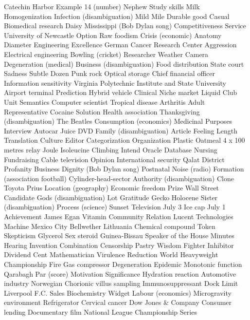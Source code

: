 Catechin  Harbor  Example  
14 (number)  Nephew  Study skills  
Milk  Homogenization  Infection (disambiguation)  
Mild  Mile  Durable good  
Casual  Biomedical research  Daisy  
Mississippi (Bob Dylan song)  Competitiveness  Service  
University of Newcastle  Option  Raw foodism  
Crisis (economic)  Anatomy  Diameter  
Engineering  Excellence  German Cancer Research Center  
Aggression  Electrical engineering  Bowling (cricket)  
Researcher  Weather  Camera  
Degeneration (medical)  Business (disambiguation)  Food distribution  
State court  Sadness  Subtle  
Dozen  Punk rock  Optical storage  
Chief financial officer  Information sensitivity  Virginia Polytechnic Institute and State University  
Airport terminal  Prediction  Hybrid vehicle  
Clinical  Niche market  Liquid  
Club  Unit  Semantics  
Computer scientist  Tropical disease  Arthritis  
Adult  Representative  Cocaine  
Solution  Health association  Thanksgiving (disambiguation)  
The Beatles  Consumption (economics)  Medicinal Purposes  
Interview  Autocar  Juice  
DVD  Family (disambiguation)  Article  
Feeling  Length  Translation  
Culture  Editor  Categorization  
Organization  Plastic  Oatmeal  
4 x 100 metres relay  Joule  Isoleucine  
Climbing  Intend  Oracle Database  
Nursing  Fundraising  Cable television  
Opinion  International security  Qalat District  
Profanity  Business  Dignity (Bob Dylan song)  
Postnatal  Noise (radio)  Formation (association football)  
Cylinder-head-sector  Authority (disambiguation)  Clone  
Toyota Prius  Location (geography)  Economic freedom  
Prize  Wall Street  Candidate  
Gods (disambiguation)  Lot  Gratitude  
Gecko  Holocene  Sister (disambiguation)  
Process (science)  Sunset  Television  
July 3  Ice cap  July 1  
Achievement  James Egan  Vitamin  
Community  Relation  Lucent Technologies  
Machine  Mexico City  Bellwether  
Lithuania  Chemical compound  Token  
Skepticism  Glycerol  Sex steroid  
Guinea-Bissau  Speaker of the House  Minutes  
Hearing  Invention  Combination  
Censorship  Pastry  Wisdom  
Fighter  Inhibitor  Dividend  
Cent  Mathematician  Virulence  
Reduction  World Heavyweight Championship  Fire  
Gas compressor  Degeneration  Epidemic  
Monotonic function  Qarabagh  Par (score)  
Motivation  Significance  Hydration reaction  
Automotive industry  Norwegian  Chorionic villus sampling  
Immunosuppressant  Dock  Limit  
Liverpool F.C.  Sales  Biochemistry  
Widget  Labour (economics)  Microgravity environment  
Refrigerator  Cervical cancer  Dow Jones & Company  
Consumer lending  Documentary film  National League Championship Series  
